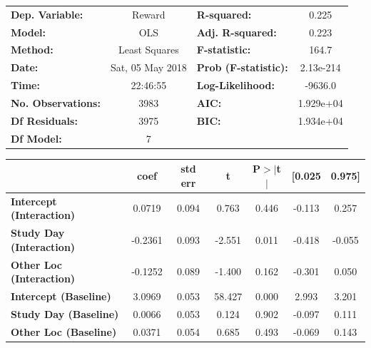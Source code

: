 \begin{table}
\begin{tabular}{lclc}
\toprule
\textbf{Dep. Variable:}                &      Reward       & \textbf{  R-squared:         } &     0.225   \\
\textbf{Model:}                        &       OLS        & \textbf{  Adj. R-squared:    } &     0.223   \\
\textbf{Method:}                       &  Least Squares   & \textbf{  F-statistic:       } &     164.7   \\
\textbf{Date:}                         & Sat, 05 May 2018 & \textbf{  Prob (F-statistic):} & 2.13e-214   \\
\textbf{Time:}                         &     22:46:55     & \textbf{  Log-Likelihood:    } &   -9636.0   \\
\textbf{No. Observations:}             &        3983      & \textbf{  AIC:               } & 1.929e+04   \\
\textbf{Df Residuals:}                 &        3975      & \textbf{  BIC:               } & 1.934e+04   \\
\textbf{Df Model:}                     &           7      & \textbf{                     } &             \\
\bottomrule
\end{tabular}
\begin{tabular}{lcccccc}
                                       & \textbf{coef} & \textbf{std err} & \textbf{t} & \textbf{P$>$$|$t$|$} & \textbf{[0.025} & \textbf{0.975]}  \\
\midrule
\textbf{Intercept (Interaction)}       &       0.0719  &        0.094     &     0.763  &         0.446        &       -0.113    &        0.257     \\
\textbf{Study Day (Interaction)}       &      -0.2361  &        0.093     &    -2.551  &         0.011        &       -0.418    &       -0.055     \\
\textbf{Other Loc (Interaction)}       &      -0.1252  &        0.089     &    -1.400  &         0.162        &       -0.301    &        0.050     \\
\textbf{Intercept (Baseline)}          &       3.0969  &        0.053     &    58.427  &         0.000        &        2.993    &        3.201     \\
\textbf{Study Day (Baseline)}          &       0.0066  &        0.053     &     0.124  &         0.902        &       -0.097    &        0.111     \\
\textbf{Other Loc (Baseline)}          &       0.0371  &        0.054     &     0.685  &         0.493        &       -0.069    &        0.143     \\

\end{tabular}
\end{table}
